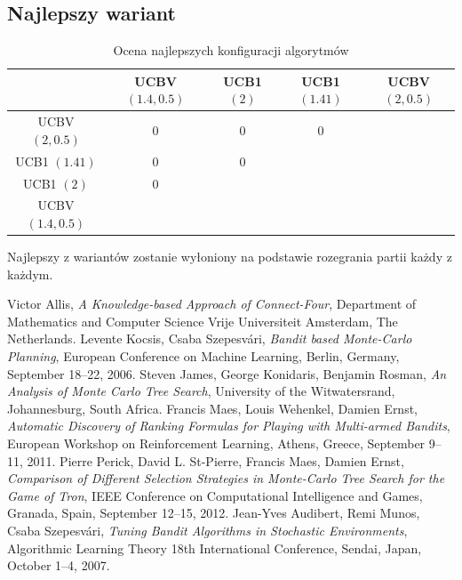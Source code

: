 \documentclass[a4paper,12pt]{article}
\begin{document}
\clearpage

\subsection{Najlepszy wariant}
\begin{table}[!h]
	\centering
	\begin{tabular}{|c|c|c|c|c|} \hline
		& UCBV $(1.4, 0.5)$ & UCB1 $(2)$ & UCB1 $(1.41)$ & UCBV $(2, 0.5)$ \\ \hline
		UCBV $(2, 0.5)$ & 0 & 0 & 0 & \cellcolor{lightgray} \\ \hline
		UCB1 $(1.41)$ & 0 & 0 & \cellcolor{lightgray} & \cellcolor{lightgray} \\ \hline
		UCB1 $(2)$ & 0 & \cellcolor{lightgray} & \cellcolor{lightgray} & \cellcolor{lightgray}  \\ \hline
		UCBV $(1.4, 0.5)$ & \cellcolor{lightgray} & \cellcolor{lightgray} & \cellcolor{lightgray} & \cellcolor{lightgray} \\ \hline
	\end{tabular}
	\caption{Ocena najlepszych konfiguracji algorytmów}
	\label{tab:best_variant}
\end{table}

Najlepszy z wariantów zostanie wyłoniony na podstawie rozegrania partii każdy z każdym.

\begin{thebibliography}{20}
	 Victor Allis, \emph{A Knowledge-based Approach of Connect-Four}, Department of Mathematics and Computer Science Vrije Universiteit Amsterdam, The Netherlands. %
	 Levente Kocsis, Csaba Szepesvári, \emph{Bandit based Monte-Carlo Planning}, European Conference on Machine Learning, Berlin, Germany, September 18--22, 2006.
	 Steven James, George Konidaris, Benjamin Rosman, \emph{An Analysis of Monte Carlo Tree Search}, University of the Witwatersrand, Johannesburg, South Africa.
	 Francis Maes, Louis Wehenkel, Damien Ernst, \emph{Automatic Discovery of Ranking Formulas for Playing with Multi-armed Bandits}, European Workshop on Reinforcement Learning, Athens, Greece, September 9--11, 2011.
	 Pierre Perick, David L. St-Pierre, Francis Maes, Damien Ernst, \emph{Comparison of Different Selection Strategies in Monte-Carlo Tree Search for the Game of Tron},  IEEE Conference on Computational Intelligence and Games, Granada, Spain, September 12--15, 2012. %
	 Jean-Yves Audibert, Remi Munos, Csaba Szepesvári, \emph{Tuning Bandit Algorithms in Stochastic Environments}, Algorithmic Learning Theory 18th International Conference, Sendai, Japan, October 1--4, 2007. %
\end{thebibliography}
\end{document}
